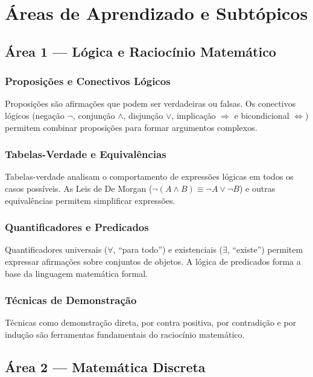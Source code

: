 \clearpage

\section{Áreas de Aprendizado e Subtópicos}

\subsection*{Área 1 --- Lógica e Raciocínio Matemático}

\subsubsection*{Proposições e Conectivos Lógicos}
Proposições são afirmações que podem ser verdadeiras ou falsas. Os conectivos lógicos
(negação $\neg$, conjunção $\wedge$, disjunção $\vee$, implicação $\Rightarrow$ e
bicondicional $\Leftrightarrow$) permitem combinar proposições para formar argumentos
complexos.

\subsubsection*{Tabelas-Verdade e Equivalências}
Tabelas-verdade analisam o comportamento de expressões lógicas em todos os casos possíveis.
As Leis de De Morgan ($\neg(A \wedge B) \equiv \neg A \vee \neg B$) e outras equivalências
permitem simplificar expressões.

\subsubsection*{Quantificadores e Predicados}
Quantificadores universais ($\forall$, ``para todo'') e existenciais ($\exists$, ``existe'')
permitem expressar afirmações sobre conjuntos de objetos. A lógica de predicados forma a
base da linguagem matemática formal.

\subsubsection*{Técnicas de Demonstração}
Técnicas como demonstração direta, por contra positiva, por contradição e por indução são
ferramentas fundamentais do raciocínio matemático.

\subsection*{Área 2 --- Matemática Discreta}

